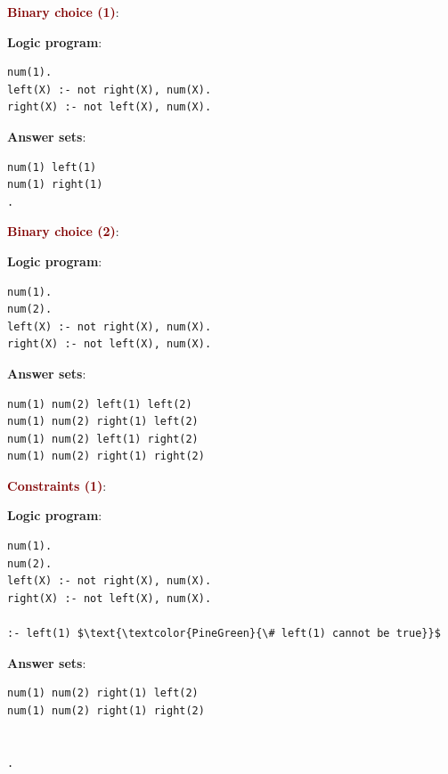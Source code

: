 {\Large \textbf{\textcolor{Maroon}{Binary choice (1)}}}: \\
\begin{minipage}{0.6\textwidth}
\textbf{Logic program}:
\begin{lstlisting}
num(1).
left(X) :- not right(X), num(X).
right(X) :- not left(X), num(X).
\end{lstlisting}
\end{minipage}
\begin{minipage}{0.4\textwidth}
\textbf{Answer sets}:
\begin{lstlisting}
num(1) left(1)
num(1) right(1)
.
\end{lstlisting}
\end{minipage}

\vspace{0.35cm}

{\Large \textbf{\textcolor{Maroon}{Binary choice (2)}}}: \\
\begin{minipage}{0.6\textwidth}
\textbf{Logic program}:
\begin{lstlisting}
num(1).
num(2).
left(X) :- not right(X), num(X).
right(X) :- not left(X), num(X).
\end{lstlisting}
\end{minipage}
\begin{minipage}{0.4\textwidth}
\textbf{Answer sets}:
\begin{lstlisting}
num(1) num(2) left(1) left(2)
num(1) num(2) right(1) left(2)
num(1) num(2) left(1) right(2)
num(1) num(2) right(1) right(2)
\end{lstlisting}
\end{minipage}

\vspace{0.35cm}

{\Large \textbf{\textcolor{Maroon}{Constraints (1)}}}: \\
\begin{minipage}{0.6\textwidth}
\textbf{Logic program}:
\begin{lstlisting}
num(1).
num(2).
left(X) :- not right(X), num(X).
right(X) :- not left(X), num(X).

:- left(1) $\text{\textcolor{PineGreen}{\# left(1) cannot be true}}$
\end{lstlisting}
\end{minipage}
\begin{minipage}{0.4\textwidth}
\textbf{Answer sets}:
\begin{lstlisting}
num(1) num(2) right(1) left(2)
num(1) num(2) right(1) right(2)


.
\end{lstlisting}
\end{minipage}

